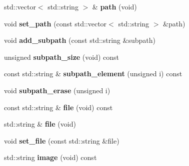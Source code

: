 \begin{DoxyCompactItemize}
\item 
std\+::vector$<$ std\+::string $>$ \& {\bfseries path} (void)\hypertarget{classstlplus_1_1file__specification_a99d627907e1690efa0530bbe5be68b49}{}\label{classstlplus_1_1file__specification_a99d627907e1690efa0530bbe5be68b49}

\item 
void {\bfseries set\+\_\+path} (const std\+::vector$<$ std\+::string $>$ \&path)\hypertarget{classstlplus_1_1file__specification_a76bd1d462e86c58c0b073eeb23fd0fe1}{}\label{classstlplus_1_1file__specification_a76bd1d462e86c58c0b073eeb23fd0fe1}

\item 
void {\bfseries add\+\_\+subpath} (const std\+::string \&subpath)\hypertarget{classstlplus_1_1file__specification_afa6d9fad56c2e2c12c9a402ce4b38086}{}\label{classstlplus_1_1file__specification_afa6d9fad56c2e2c12c9a402ce4b38086}

\item 
unsigned {\bfseries subpath\+\_\+size} (void) const \hypertarget{classstlplus_1_1file__specification_a8fd06a7d3824c52591bdf9262d8c73cc}{}\label{classstlplus_1_1file__specification_a8fd06a7d3824c52591bdf9262d8c73cc}

\item 
const std\+::string \& {\bfseries subpath\+\_\+element} (unsigned i) const \hypertarget{classstlplus_1_1file__specification_a8ca140de37a8f9960cd89654c54c247f}{}\label{classstlplus_1_1file__specification_a8ca140de37a8f9960cd89654c54c247f}

\item 
void {\bfseries subpath\+\_\+erase} (unsigned i)\hypertarget{classstlplus_1_1file__specification_a21df62606e99b1d3b8aa98b3b68d5635}{}\label{classstlplus_1_1file__specification_a21df62606e99b1d3b8aa98b3b68d5635}

\item 
const std\+::string \& {\bfseries file} (void) const \hypertarget{classstlplus_1_1file__specification_afcf47b37f1190b7be81c09a118305358}{}\label{classstlplus_1_1file__specification_afcf47b37f1190b7be81c09a118305358}

\item 
std\+::string \& {\bfseries file} (void)\hypertarget{classstlplus_1_1file__specification_aa1f8637b5ebb29c8516e9d6035cc776d}{}\label{classstlplus_1_1file__specification_aa1f8637b5ebb29c8516e9d6035cc776d}

\item 
void {\bfseries set\+\_\+file} (const std\+::string \&file)\hypertarget{classstlplus_1_1file__specification_a0e7a9e29dbcab571045cb902cf26b661}{}\label{classstlplus_1_1file__specification_a0e7a9e29dbcab571045cb902cf26b661}

\item 
std\+::string {\bfseries image} (void) const \hypertarget{classstlplus_1_1file__specification_a727a653c740de1a6c9d218ad6965b6e6}{}\label{classstlplus_1_1file__specification_a727a653c740de1a6c9d218ad6965b6e6}

\end{DoxyCompactItemize}


